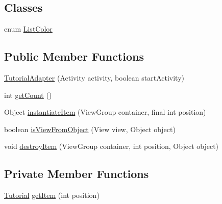 \subsection*{Classes}
\begin{DoxyCompactItemize}
\item 
enum \hyperlink{enumorg_1_1buildmlearn_1_1toolkit_1_1adapter_1_1TutorialAdapter_1_1ListColor}{List\+Color}
\end{DoxyCompactItemize}
\subsection*{Public Member Functions}
\begin{DoxyCompactItemize}
\item 
\hyperlink{classorg_1_1buildmlearn_1_1toolkit_1_1adapter_1_1TutorialAdapter_ad6e401b96ba7fcde9c0b57a3b9e5f60c}{Tutorial\+Adapter} (Activity activity, boolean start\+Activity)
\item 
int \hyperlink{classorg_1_1buildmlearn_1_1toolkit_1_1adapter_1_1TutorialAdapter_a1ea77519e1257a68116ea93bdf4a7618}{get\+Count} ()
\item 
Object \hyperlink{classorg_1_1buildmlearn_1_1toolkit_1_1adapter_1_1TutorialAdapter_a61e4fd5e541db4d32b4888a2e73b129e}{instantiate\+Item} (View\+Group container, final int position)
\item 
boolean \hyperlink{classorg_1_1buildmlearn_1_1toolkit_1_1adapter_1_1TutorialAdapter_ae8d4ccac4b3da95a24e581b25dd03646}{is\+View\+From\+Object} (View view, Object object)
\item 
void \hyperlink{classorg_1_1buildmlearn_1_1toolkit_1_1adapter_1_1TutorialAdapter_a486ba0a0346f2adf357bf97e57edb9c4}{destroy\+Item} (View\+Group container, int position, Object object)
\end{DoxyCompactItemize}
\subsection*{Private Member Functions}
\begin{DoxyCompactItemize}
\item 
\hyperlink{enumorg_1_1buildmlearn_1_1toolkit_1_1model_1_1Tutorial}{Tutorial} \hyperlink{classorg_1_1buildmlearn_1_1toolkit_1_1adapter_1_1TutorialAdapter_a2b57538f443c66c7a706128443693eda}{get\+Item} (int position)
\end{DoxyCompactItemize}
